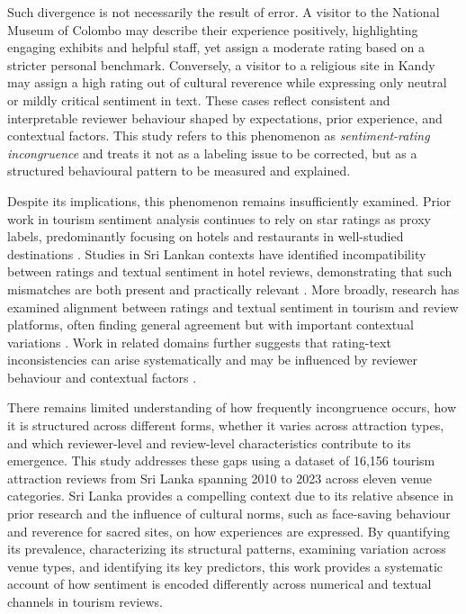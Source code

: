 \documentclass[conference]{IEEEtran}
\begin{document}
Such divergence is not necessarily the result of error. A visitor to the National Museum of Colombo may describe their experience positively, highlighting engaging exhibits and helpful staff, yet assign a moderate rating based on a stricter personal benchmark. Conversely, a visitor to a religious site in Kandy may assign a high rating out of cultural reverence while expressing only neutral or mildly critical sentiment in text. These cases reflect consistent and interpretable reviewer behaviour shaped by expectations, prior experience, and contextual factors. This study refers to this phenomenon as \textit{sentiment-rating incongruence} and treats it not as a labeling issue to be corrected, but as a structured behavioural pattern to be measured and explained.

Despite its implications, this phenomenon remains insufficiently examined. Prior work in tourism sentiment analysis continues to rely on star ratings as proxy labels, predominantly focusing on hotels and restaurants in well-studied destinations \cite{alaei2019tourism}. Studies in Sri Lankan contexts have identified incompatibility between ratings and textual sentiment in hotel reviews, demonstrating that such mismatches are both present and practically relevant \cite{abeysinghe2022selflearning,abeysinghe2021anuradhapura}. More broadly, research has examined alignment between ratings and textual sentiment in tourism and review platforms, often finding general agreement but with important contextual variations \cite{bigne2023aligned}. Work in related domains further suggests that rating-text inconsistencies can arise systematically and may be influenced by reviewer behaviour and contextual factors \cite{kwon2025beyond,chua2015helpfulness}.

There remains limited understanding of how frequently incongruence occurs, how it is structured across different forms, whether it varies across attraction types, and which reviewer-level and review-level characteristics contribute to its emergence. This study addresses these gaps using a dataset of 16,156 tourism attraction reviews from Sri Lanka spanning 2010 to 2023 \cite{sewwandi2023} across eleven venue categories. Sri Lanka provides a compelling context due to its relative absence in prior research and the influence of cultural norms, such as face-saving behaviour and reverence for sacred sites, on how experiences are expressed. By quantifying its prevalence, characterizing its structural patterns, examining variation across venue types, and identifying its key predictors, this work provides a systematic account of how sentiment is encoded differently across numerical and textual channels in tourism reviews.
\end{document}
